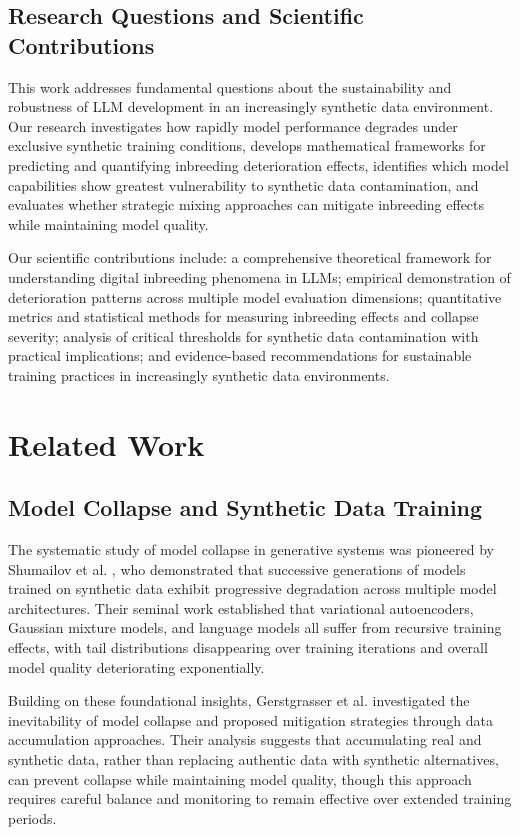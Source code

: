 \documentclass{article}
\begin{document}
\subsection{Research Questions and Scientific Contributions}

This work addresses fundamental questions about the sustainability and robustness of LLM development in an increasingly synthetic data environment. Our research investigates how rapidly model performance degrades under exclusive synthetic training conditions, develops mathematical frameworks for predicting and quantifying inbreeding deterioration effects, identifies which model capabilities show greatest vulnerability to synthetic data contamination, and evaluates whether strategic mixing approaches can mitigate inbreeding effects while maintaining model quality.

Our scientific contributions include: a comprehensive theoretical framework for understanding digital inbreeding phenomena in LLMs; empirical demonstration of deterioration patterns across multiple model evaluation dimensions; quantitative metrics and statistical methods for measuring inbreeding effects and collapse severity; analysis of critical thresholds for synthetic data contamination with practical implications; and evidence-based recommendations for sustainable training practices in increasingly synthetic data environments.

\section{Related Work}

\subsection{Model Collapse and Synthetic Data Training}

The systematic study of model collapse in generative systems was pioneered by Shumailov et al. \cite{shumailov2023curse}, who demonstrated that successive generations of models trained on synthetic data exhibit progressive degradation across multiple model architectures. Their seminal work established that variational autoencoders, Gaussian mixture models, and language models all suffer from recursive training effects, with tail distributions disappearing over training iterations and overall model quality deteriorating exponentially.

Building on these foundational insights, Gerstgrasser et al. \cite{gerstgrasser2024model} investigated the inevitability of model collapse and proposed mitigation strategies through data accumulation approaches. Their analysis suggests that accumulating real and synthetic data, rather than replacing authentic data with synthetic alternatives, can prevent collapse while maintaining model quality, though this approach requires careful balance and monitoring to remain effective over extended training periods.
\end{document}
